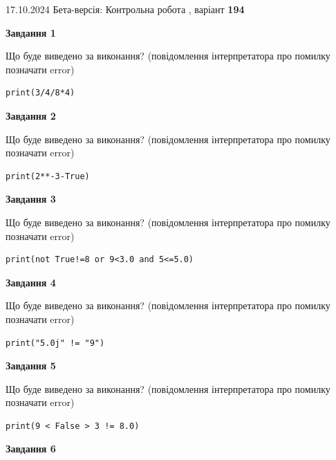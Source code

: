 \documentclass[12pt, ukrainian]{article}
\begin{document}
{\Large{17.10.2024 Бета-версія: Контрольна робота , варіант  \No \textbf { 194 }\par}}
{
\begin {large}
{\begin {center}\textbf{Завдання 1}\end {center}}

Що буде виведено за виконання? (повідомлення інтерпретатора про помилку позначати error)\par
\begin{verbatim}
print(3/4/8*4)
\end{verbatim}

{\begin {center}\textbf{Завдання 2}\end {center}}

Що буде виведено за виконання? (повідомлення інтерпретатора про помилку позначати error)\par
\begin{verbatim}
print(2**-3-True)
\end{verbatim}

{\begin {center}\textbf{Завдання 3}\end {center}}

Що буде виведено за виконання? (повідомлення інтерпретатора про помилку позначати error)\par
\begin{verbatim}
print(not True!=8 or 9<3.0 and 5<=5.0)
\end{verbatim}

{\begin {center}\textbf{Завдання 4}\end {center}}

Що буде виведено за виконання? (повідомлення інтерпретатора про помилку позначати error)\par
\begin{verbatim}
print("5.0j" != "9")
\end{verbatim}

{\begin {center}\textbf{Завдання 5}\end {center}}

Що буде виведено за виконання? (повідомлення інтерпретатора про помилку позначати error)\par
\begin{verbatim}
print(9 < False > 3 != 8.0)
\end{verbatim}

{\begin {center}\textbf{Завдання 6}\end {center}}


\end{large}}
\end{document}
